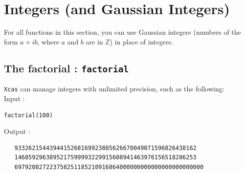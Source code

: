 \documentclass[a4paper,11pt]{book}
\begin{document}
\section{Integers (and Gaussian Integers)}
 For all functions in this section, you can use Gaussian integers (numbers of 
the form  $a+ib$, where $a$ and $b$ are in  $\mathbb Z$) in place of integers.

\subsection{The factorial : {\tt factorial}}
{\tt Xcas} can manage integers with unlimited precision, such as the 
following:\\ 
Input :
\begin{center}{\tt factorial(100)}\end{center}
Output :
\begin{verbatim}
   9332621544394415268169923885626670049071596826438162
   1468592963895217599993229915608941463976156518286253
   697920827223758251185210916864000000000000000000000000
\end{verbatim}
\end{document}
